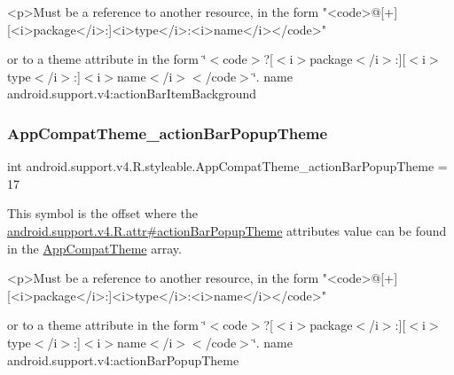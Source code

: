 \begin{DoxyVerb}      <p>Must be a reference to another resource, in the form "<code>@[+][<i>package</i>:]<i>type</i>:<i>name</i></code>"
\end{DoxyVerb}
 or to a theme attribute in the form \char`\"{}$<$code$>$?\mbox{[}$<$i$>$package$<$/i$>$\+:\mbox{]}\mbox{[}$<$i$>$type$<$/i$>$\+:\mbox{]}$<$i$>$name$<$/i$>$$<$/code$>$\char`\"{}.  name android.\+support.\+v4\+:action\+Bar\+Item\+Background \mbox{\label{classandroid_1_1support_1_1v4_1_1R_1_1styleable_add3e5d5f9d1b972dd09d10ff0cc47d4d}} 
\subsubsection{\texorpdfstring{App\+Compat\+Theme\+\_\+action\+Bar\+Popup\+Theme}{AppCompatTheme\_actionBarPopupTheme}}
{\footnotesize\ttfamily int android.\+support.\+v4.\+R.\+styleable.\+App\+Compat\+Theme\+\_\+action\+Bar\+Popup\+Theme = 17\hspace{0.3cm}{\ttfamily [static]}}

This symbol is the offset where the \hyperlink{classandroid_1_1support_1_1v4_1_1R_1_1attr_a3016742eee7a92b95fbccce06beffd5b}{android.\+support.\+v4.\+R.\+attr\#action\+Bar\+Popup\+Theme} attribute\textquotesingle{}s value can be found in the \hyperlink{classandroid_1_1support_1_1v4_1_1R_1_1styleable_ac07ebbe62ed977f6dcaadc6397840ace}{App\+Compat\+Theme} array.

\begin{DoxyVerb}      <p>Must be a reference to another resource, in the form "<code>@[+][<i>package</i>:]<i>type</i>:<i>name</i></code>"
\end{DoxyVerb}
 or to a theme attribute in the form \char`\"{}$<$code$>$?\mbox{[}$<$i$>$package$<$/i$>$\+:\mbox{]}\mbox{[}$<$i$>$type$<$/i$>$\+:\mbox{]}$<$i$>$name$<$/i$>$$<$/code$>$\char`\"{}.  name android.\+support.\+v4\+:action\+Bar\+Popup\+Theme \mbox{\label{classandroid_1_1support_1_1v4_1_1R_1_1styleable_aa92fde6683d052bff4e488f9f4dfdacc}} 
